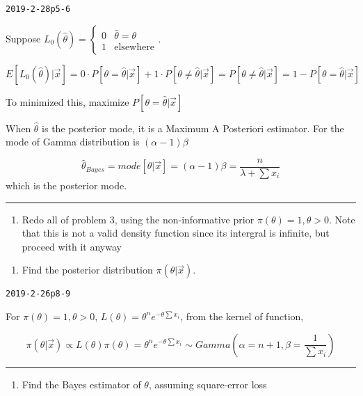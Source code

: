 \documentclass[12pt,]{article}
\providecommand{\tightlist}{%
  \setlength{\itemsep}{0pt}\setlength{\parskip}{0pt}}
\begin{document}
\texttt{2019-2-28p5-6}

Suppose
\(L_0(\hat\theta)=\begin{cases}0&\hat\theta=\theta\\1&\text{elsewhere}\end{cases}\).

\[E[L_0(\hat\theta)|\vec x]=0\cdot P[\theta=\hat\theta|\vec x]+1\cdot P[\theta\neq\hat\theta|\vec x]=P[\theta\neq\hat\theta|\vec x]=1-P[\theta=\hat\theta|\vec x]\]

To minimized this, maximize \(P[\theta=\hat\theta|\vec x]\)

When \(\hat\theta\) is the posterior mode, it is a Maximum A Posteriori
estimator. For the mode of Gamma distribution is \((\alpha-1)\beta\)

\[\hat\theta_{Bayes}=mode[\theta|\vec x]=(\alpha-1)\beta=\frac{n}{\lambda+\sum x_i}\]
which is the posterior mode.

\begin{center}\rule{0.5\linewidth}{\linethickness}\end{center}

\begin{enumerate}
\def\labelenumi{\arabic{enumi}.}
\setcounter{enumi}{3}
\tightlist
\item
  \textcolor[rgb]{0.5,0.5,0.5}{Redo all of problem 3, using the non-informative prior $\pi(\theta)=1,\theta>0$. Note that this is not a valid density function since its intergral is infinite, but proceed with it anyway}
\end{enumerate}

\begin{enumerate}
\def\labelenumi{\alph{enumi}.}
\tightlist
\item
  \textcolor[rgb]{0.5,0.5,0.5}{Find the posterior distribution $\pi(\theta|\vec x)$.}
\end{enumerate}

\texttt{2019-2-26p8-9}

For \(\pi(\theta)=1,\theta>0\),
\(L(\theta)=\theta^n e^{-\theta\sum x_i}\), from the kernel of function,

\[\pi(\theta|\vec x)\propto L(\theta)\pi(\theta)=\theta^n e^{-\theta\sum x_i}\sim Gamma(\alpha=n+1,\beta=\frac1{\sum x_i})\]

\begin{center}\rule{0.5\linewidth}{\linethickness}\end{center}

\begin{enumerate}
\def\labelenumi{\alph{enumi}.}
\setcounter{enumi}{1}
\tightlist
\item
  \textcolor[rgb]{0.5,0.5,0.5}{Find the Bayes estimator of $\theta$, assuming square-error loss}
\end{enumerate}
\end{document}
